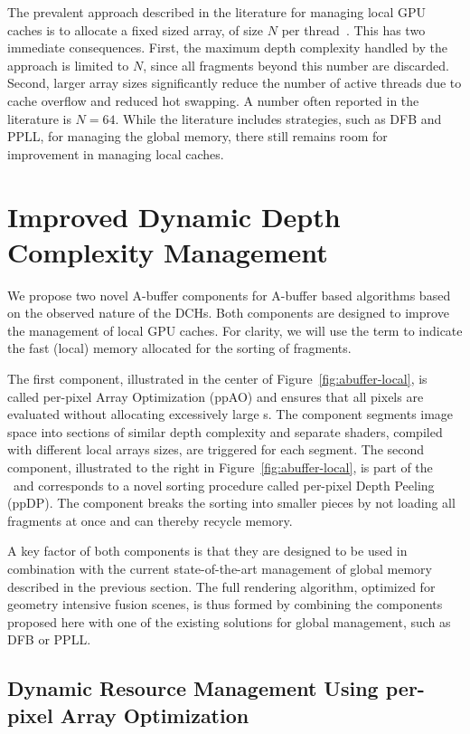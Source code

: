 \documentclass{egpubl}
\newcommand{\ab}{\mbox{A-buffer}}
\newcommand{\dch}{DCH}
\newcommand{\stencil}{ppAO}
\newcommand{\dloop}{ppDP}
\begin{document}
The prevalent approach described in the literature for managing local GPU caches is to allocate a fixed sized array, of size $N$ per thread~\cite{Crassin2010,Maule2012}. 
This has two immediate consequences. 
First, the maximum depth complexity handled by the approach is limited to $N$, since all fragments beyond this number are discarded.
Second, larger array sizes significantly reduce the number of active threads due to cache overflow and reduced hot swapping. 
A number often reported in the literature is $N=64$. 
While the literature includes strategies, such as DFB and PPLL, for managing the global memory, there still remains room for improvement in managing local caches.


\section{Improved Dynamic Depth Complexity Management}
\label{sec:oit-local}

We propose two novel \ab{} components for \ab{} based algorithms based on the observed nature of the \dch{}s. 
Both components are designed to improve the management of local GPU caches. 
For clarity, we will use the term \bArray{} to indicate the fast (local) memory allocated for the sorting of fragments. 

The first component, illustrated in the center of Figure~\ref{fig:abuffer-local}, is called {per-pixel Array Optimization} (\stencil) and ensures that all pixels are evaluated without allocating excessively large \bArray{}s. 
The component segments image space into sections of similar depth complexity and separate shaders, compiled with different local arrays sizes, are triggered for each segment. 
The second component, illustrated to the right in Figure~\ref{fig:abuffer-local}, is part of the \sResolve\ and corresponds to a novel sorting procedure called per-pixel Depth Peeling (\dloop).
The component breaks the sorting into smaller pieces by not loading all fragments at once and can thereby recycle memory. 

A key factor of both components is that they are designed to be used in combination with the current state-of-the-art management of global memory described in the previous section. 
The full rendering algorithm, optimized for geometry intensive fusion scenes, is thus formed by combining the components proposed here with one of the existing solutions for global management, such as DFB or PPLL. 


\subsection{Dynamic Resource Management Using per-pixel Array Optimization}
\label{sec:ppao}
\end{document}
